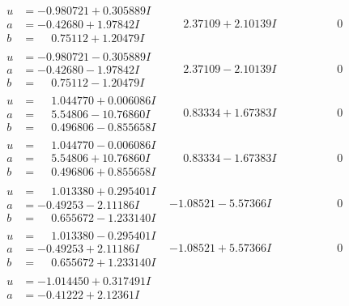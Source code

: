 \documentclass[1p]{elsarticle_modified}
\theoremstyle{definition}
\begin{document}
$$\begin{array}{c|c|c}
 \hline 
\begin{aligned}
u &= -0.980721 + 0.305889 I \\
a &= -0.42680 + 1.97842 I \\
b &= \phantom{-}0.75112 + 1.20479 I\end{aligned}
 & \phantom{-}2.37109 + 2.10139 I & \phantom{-0.000000 } 0 \\ \hline\begin{aligned}
u &= -0.980721 - 0.305889 I \\
a &= -0.42680 - 1.97842 I \\
b &= \phantom{-}0.75112 - 1.20479 I\end{aligned}
 & \phantom{-}2.37109 - 2.10139 I & \phantom{-0.000000 } 0 \\ \hline\begin{aligned}
u &= \phantom{-}1.044770 + 0.006086 I \\
a &= \phantom{-}5.54806 - 10.76860 I \\
b &= \phantom{-}0.496806 - 0.855658 I\end{aligned}
 & \phantom{-}0.83334 + 1.67383 I & \phantom{-0.000000 } 0 \\ \hline\begin{aligned}
u &= \phantom{-}1.044770 - 0.006086 I \\
a &= \phantom{-}5.54806 + 10.76860 I \\
b &= \phantom{-}0.496806 + 0.855658 I\end{aligned}
 & \phantom{-}0.83334 - 1.67383 I & \phantom{-0.000000 } 0 \\ \hline\begin{aligned}
u &= \phantom{-}1.013380 + 0.295401 I \\
a &= -0.49253 - 2.11186 I \\
b &= \phantom{-}0.655672 - 1.233140 I\end{aligned}
 & -1.08521 - 5.57366 I & \phantom{-0.000000 } 0 \\ \hline\begin{aligned}
u &= \phantom{-}1.013380 - 0.295401 I \\
a &= -0.49253 + 2.11186 I \\
b &= \phantom{-}0.655672 + 1.233140 I\end{aligned}
 & -1.08521 + 5.57366 I & \phantom{-0.000000 } 0 \\ \hline\begin{aligned}
u &= -1.014450 + 0.317491 I \\
a &= -0.41222 + 2.12361 I \\

\end{aligned}
\end{array}$$
\end{document}
